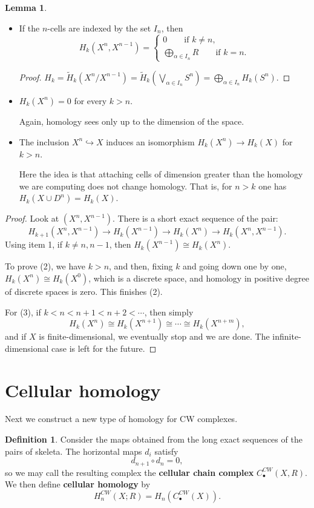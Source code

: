 \documentclass{book}
\theoremstyle{definition}
\newtheorem*{defn}{Definition}
\newtheorem*{lema}{Lemma}
\begin{document}
\begin{lema}\leavevmode
\begin{itemize}
\item If the $n$-cells are indexed by the set $I_n$, then
$$
H_k(X^n,X^{n-1})=
\begin{cases}
0\qquad\text{if }k\neq n,\\
\bigoplus_{\alpha\in I_n}R\qquad\text{if }k=n.
\end{cases}
$$
\begin{proof}
$H_k=\tilde H_k(X^n/X^{n-1})
=\tilde H_k(\bigvee_{\alpha\in I_n}S^n)
=\bigoplus_{\alpha\in I_n}H_k(S^n)$.
\end{proof}
\item $H_k(X^n)=0$ for every $k>n$.

Again, homology sees only up to the dimension of the space.
\item The inclusion $X^n\hookrightarrow X$ induces an
isomorphism $H_k(X^n)\to H_k(X)$ for $k>n$.

Here the idea is that attaching cells of dimension greater
than the homology we are computing does not change homology.
That is, for $n>k$ one has $H_k(X\cup D^n)=H_k(X)$.
\end{itemize}
\end{lema}

\begin{proof}
Look at $(X^n,X^{n-1})$. There is a short exact sequence of
the pair:
$$
H_{k+1}(X^n,X^{n-1})\to H_k(X^{n-1})
\to H_k(X^n)\to H_k(X^n,X^{n-1}).
$$
Using item 1, if $k\neq n,n-1$, then
$H_k(X^{n-1})\cong H_k(X^n)$.

To prove (2), we have $k>n$, and then, fixing $k$ and going
down one by one, $H_k(X^n)\cong H_k(X^0)$, which is a
discrete space, and homology in positive degree of discrete
spaces is zero. This finishes (2).

For (3), if $k<n<n+1<n+2<\cdots$, then simply
$$
H_k(X^n)\cong H_k(X^{n+1})\cong\cdots\cong H_k(X^{n+m}),
$$
and if $X$ is finite-dimensional, we eventually stop and we
are done. The infinite-dimensional case is left for the
future.
\end{proof}

\section{Cellular homology}

Next we construct a new type of homology for CW complexes.

\begin{defn}
Consider the maps obtained from the long exact sequences of
the pairs of skeleta. The horizontal maps $d_i$ satisfy
$$
d_{n+1}\circ d_n=0,
$$
so we may call the resulting complex the
\textbf{cellular chain complex} $C_\bullet^{CW}(X,R)$. We
then define \textbf{cellular homology} by
$$
H_n^{CW}(X;R)=H_n(C_\bullet^{CW}(X)).
$$
\end{defn}
\end{document}
